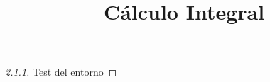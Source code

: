 \documentclass[12pt]{article}
\theoremstyle{fctaylor}
\newtheorem{proof}{Demostración}[subsection]
\begin{document}
\date{}

\title{Cálculo Integral}
 
\maketitle

\begin{proof}[2.1.1]
	Test del entorno
\end{proof}
\end{document}
